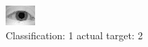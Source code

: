 \begin{figure}[h!]
\begin{center}
\includegraphics[width=0.60\columnwidth]{figures/ID987_class_1_target_2.png}
\end{center}
\caption{ Classification: 1 actual target: 2}
\label{fig:ID987_class_1_target_2}
\end{figure}
